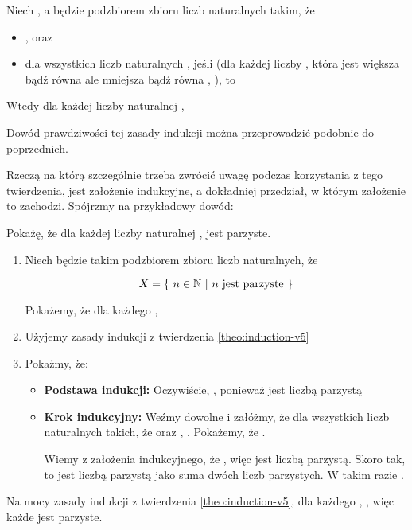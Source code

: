\begin{theo}
Niech , a  będzie podzbiorem zbioru liczb naturalnych takim, że
\begin{itemize}
    \item {}, oraz
    \item dla wszystkich liczb naturalnych , jeśli  (dla każdej liczby , która jest większa bądź równa  ale mniejsza bądź równa , ), to 
\end{itemize}
Wtedy dla każdej liczby naturalnej , 
\label{theo:induction-v5}
\end{theo}

Dowód prawdziwości tej zasady indukcji można przeprowadzić podobnie do poprzednich.

Rzeczą na którą szczególnie trzeba zwrócić uwagę podczas korzystania z tego twierdzenia, jest założenie indukcyjne, a dokładniej przedział, w którym założenie to zachodzi. Spójrzmy na przykładowy dowód:

\begin{example}
Pokażę, że dla każdej liczby naturalnej ,  jest parzyste.

\begin{enumerate}
    \item Niech  będzie takim podzbiorem zbioru liczb naturalnych, że
    
    \[
        X = \{\ n \in \mathbb{N}\ |\ n \text{ jest parzyste}\ \}
    \]
    
    Pokażemy, że dla każdego , 
    \item Użyjemy zasady indukcji z twierdzenia \ref{theo:induction-v5}
    
    \item Pokażmy, że:
    \begin{itemize}
        \item \textbf{Podstawa indukcji:}
        Oczywiście, , ponieważ  jest liczbą parzystą
        
        \item \textbf{Krok indukcyjny:}
        Weźmy dowolne  i załóżmy, że dla wszystkich liczb naturalnych  takich, że  oraz , . Pokażemy, że .
        
        Wiemy z założenia indukcyjnego, że , więc  jest liczbą parzystą. Skoro tak, to  jest liczbą parzystą jako suma dwóch liczb parzystych. W takim razie .
    \end{itemize}
\end{enumerate}
Na mocy zasady indukcji z twierdzenia \ref{theo:induction-v5}, dla każdego , , więc każde  jest parzyste.
\end{example}

